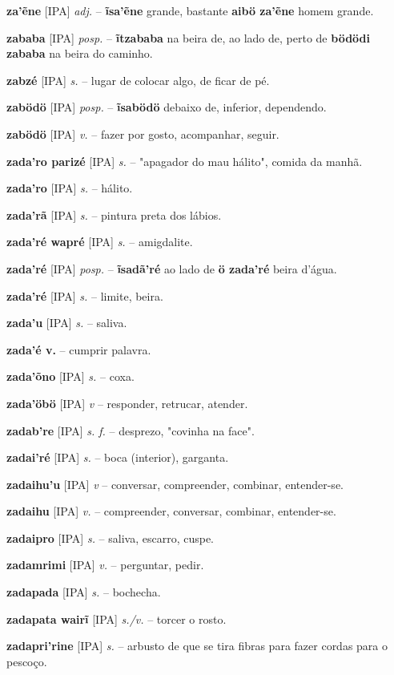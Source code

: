 \textbf{za'ẽne} [IPA] \textit{adj.} -- \textbf{ĩsa'ẽne} grande, bastante  \textbf{aibö za'ẽne} homem grande.

\textbf{zababa} [IPA] \textit{posp.} -- \textbf{ĩtzababa} na beira de, ao lado de, perto de  \textbf{bödödi zababa} na beira do caminho.

\textbf{zabzé} [IPA] \textit{s.} -- lugar de colocar algo, de ficar de pé.

\textbf{zabödö} [IPA] \textit{posp.} -- \textbf{ĩsabödö} debaixo de, inferior, dependendo.

\textbf{zabödö} [IPA] \textit{v.} -- fazer por gosto, acompanhar, seguir.

\textbf{zada'ro parizé} [IPA] \textit{s.} -- "apagador do mau hálito", comida da manhã.

\textbf{zada'ro} [IPA] \textit{s.} -- hálito.

\textbf{zada'rã} [IPA] \textit{s.} -- pintura preta dos lábios.

\textbf{zada'ré wapré} [IPA] \textit{s.} -- amigdalite.

\textbf{zada'ré} [IPA] \textit{posp.} -- \textbf{ĩsadã'ré} ao lado de  \textbf{ö zada'ré} beira d'água.

\textbf{zada'ré} [IPA] \textit{s.} -- limite, beira.

\textbf{zada'u} [IPA] \textit{s.} -- saliva.

\textbf{zada'é v.} -- cumprir palavra.

\textbf{zada'õno} [IPA] \textit{s.} -- coxa.

\textbf{zada'öbö} [IPA] \textit{v} -- responder, retrucar, atender.

\textbf{zadab're} [IPA] \textit{s. f.} -- desprezo, "covinha na face".

\textbf{zadai'ré} [IPA] \textit{s.} -- boca (interior), garganta.

\textbf{zadaihu'u} [IPA] \textit{v} -- conversar, compreender, combinar, entender-se.

\textbf{zadaihu} [IPA] \textit{v.} -- compreender, conversar, combinar, entender-se.

\textbf{zadaipro} [IPA] \textit{s.} -- saliva, escarro, cuspe.

\textbf{zadamrimi} [IPA] \textit{v.} -- perguntar, pedir.

\textbf{zadapada} [IPA] \textit{s.} -- bochecha.

\textbf{zadapata wairĩ} [IPA] \textit{s./v.} -- torcer o rosto.

\textbf{zadapri'rine} [IPA] \textit{s.} -- arbusto de que se tira fibras para fazer cordas para o pescoço.

